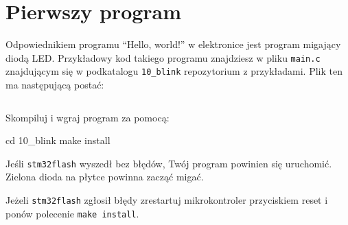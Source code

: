 % 
% 
% 
% 


\section{Pierwszy program}
Odpowiednikiem programu ``Hello, world!'' w elektronice jest program migający diodą LED.
Przykładowy kod takiego programu znajdziesz w pliku \Verb$main.c$ znajdującym się w podkatalogu \Verb$10_blink$ repozytorium z przykładami.
Plik ten ma następującą postać:

\inputminted[frame=single,firstline=6]{c}{stm32-examples/10_blink/main.c}

Skompiluj i wgraj program za pomocą:

\begin{CodeFrame*}[bash]{}
cd 10_blink
make install
\end{CodeFrame*}

Jeśli \Verb$stm32flash$ wyszedł bez błędów, Twój program powinien się uruchomić. Zielona dioda na płytce powinna zacząć migać.

Jeżeli \Verb$stm32flash$ zgłosił błędy zrestartuj mikrokontroler przyciskiem reset i ponów polecenie \Verb$make install$.

